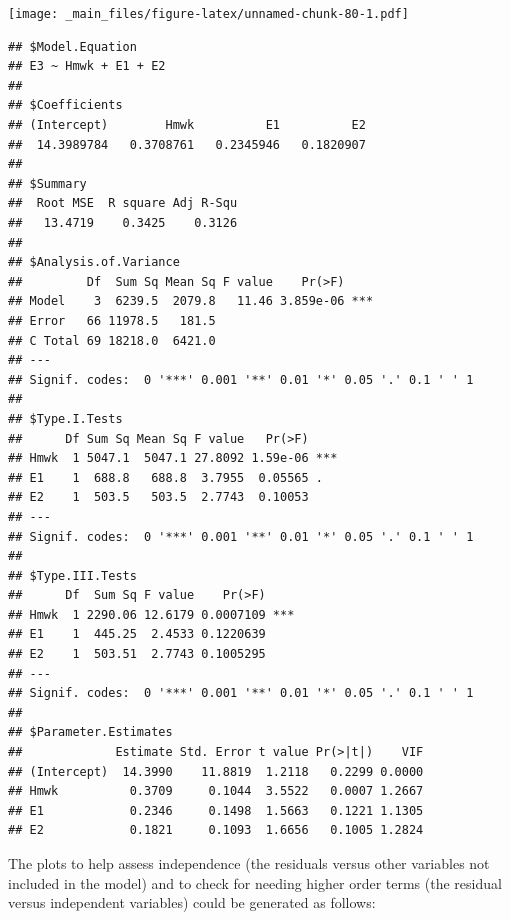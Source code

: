 \documentclass[
]{book}
\newenvironment{Shaded}{\begin{snugshade}}{\end{snugshade}}
\newcommand{\AttributeTok}[1]{\textcolor[rgb]{0.77,0.63,0.00}{#1}}
\newcommand{\DecValTok}[1]{\textcolor[rgb]{0.00,0.00,0.81}{#1}}
\newcommand{\DocumentationTok}[1]{\textcolor[rgb]{0.56,0.35,0.01}{\textbf{\textit{#1}}}}
\newcommand{\FunctionTok}[1]{\textcolor[rgb]{0.00,0.00,0.00}{#1}}
\newcommand{\NormalTok}[1]{#1}
\newcommand{\OtherTok}[1]{\textcolor[rgb]{0.56,0.35,0.01}{#1}}
\newcommand{\SpecialCharTok}[1]{\textcolor[rgb]{0.00,0.00,0.00}{#1}}
\begin{document}
\texttt{[image: \_main\_files/figure-latex/unnamed-chunk-80-1.pdf]}

\begin{verbatim}
## $Model.Equation
## E3 ~ Hmwk + E1 + E2
## 
## $Coefficients
## (Intercept)        Hmwk          E1          E2 
##  14.3989784   0.3708761   0.2345946   0.1820907 
## 
## $Summary
##  Root MSE  R square Adj R-Squ 
##   13.4719    0.3425    0.3126 
## 
## $Analysis.of.Variance
##         Df  Sum Sq Mean Sq F value    Pr(>F)    
## Model    3  6239.5  2079.8   11.46 3.859e-06 ***
## Error   66 11978.5   181.5                      
## C Total 69 18218.0  6421.0                      
## ---
## Signif. codes:  0 '***' 0.001 '**' 0.01 '*' 0.05 '.' 0.1 ' ' 1
## 
## $Type.I.Tests
##      Df Sum Sq Mean Sq F value   Pr(>F)    
## Hmwk  1 5047.1  5047.1 27.8092 1.59e-06 ***
## E1    1  688.8   688.8  3.7955  0.05565 .  
## E2    1  503.5   503.5  2.7743  0.10053    
## ---
## Signif. codes:  0 '***' 0.001 '**' 0.01 '*' 0.05 '.' 0.1 ' ' 1
## 
## $Type.III.Tests
##      Df  Sum Sq F value    Pr(>F)    
## Hmwk  1 2290.06 12.6179 0.0007109 ***
## E1    1  445.25  2.4533 0.1220639    
## E2    1  503.51  2.7743 0.1005295    
## ---
## Signif. codes:  0 '***' 0.001 '**' 0.01 '*' 0.05 '.' 0.1 ' ' 1
## 
## $Parameter.Estimates
##             Estimate Std. Error t value Pr(>|t|)    VIF
## (Intercept)  14.3990    11.8819  1.2118   0.2299 0.0000
## Hmwk          0.3709     0.1044  3.5522   0.0007 1.2667
## E1            0.2346     0.1498  1.5663   0.1221 1.1305
## E2            0.1821     0.1093  1.6656   0.1005 1.2824
\end{verbatim}

The plots to help assess independence (the residuals versus other variables not included in the model) and to check for needing higher order terms (the residual versus independent variables) could be generated as follows:

\begin{Shaded}
\end{Shaded}
\end{document}
